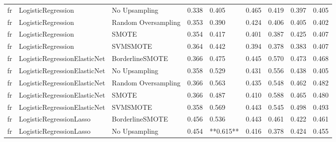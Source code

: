 \begin{tabular}{lllllllll}
      fr &           LogisticRegression &       No Upsampling & 0.338 &                     0.405 &                 0.465 &                  0.419 &                                   0.397 &     0.405 \\
      fr &           LogisticRegression & Random Oversampling & 0.353 &                     0.390 &                 0.424 &                  0.406 &                                   0.405 &     0.402 \\
      fr &           LogisticRegression &               SMOTE & 0.354 &                     0.417 &                 0.401 &                  0.387 &                                   0.425 &     0.407 \\
      fr &           LogisticRegression &            SVMSMOTE & 0.364 &                     0.442 &                 0.394 &                  0.378 &                                   0.383 &     0.407 \\
      fr & LogisticRegressionElasticNet &     BorderlineSMOTE & 0.366 &                     0.475 &                 0.445 &                  0.570 &                                   0.473 &     0.468 \\
      fr & LogisticRegressionElasticNet &       No Upsampling & 0.358 &                     0.529 &                 0.431 &                  0.556 &                                   0.438 &     0.405 \\
      fr & LogisticRegressionElasticNet & Random Oversampling & 0.366 &                     0.563 &                 0.435 &                  0.548 &                                   0.462 &     0.482 \\
      fr & LogisticRegressionElasticNet &               SMOTE & 0.366 &                     0.487 &                 0.410 &                  0.588 &                                   0.465 &     0.480 \\
      fr & LogisticRegressionElasticNet &            SVMSMOTE & 0.358 &                     0.569 &                 0.443 &                  0.545 &                                   0.498 &     0.493 \\
      fr &      LogisticRegressionLasso &     BorderlineSMOTE & 0.456 &                     0.536 &                 0.443 &                  0.461 &                                   0.422 &     0.461 \\
      fr &      LogisticRegressionLasso &       No Upsampling & 0.454 &                 **0.615** &                 0.416 &                  0.378 &                                   0.424 &     0.455 \\

\end{tabular}

